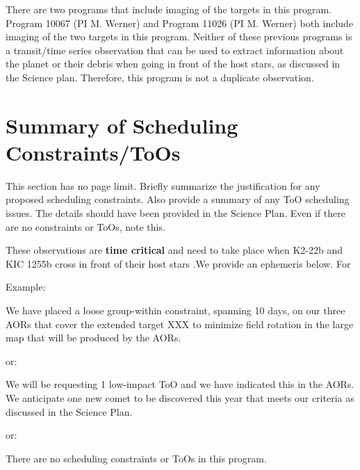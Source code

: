 \documentclass[letterpaper,12pt]{article}
\begin{document}
There are two programs that include imaging of the targets in this program.
Program 10067 (PI M. Werner) and Program 11026 (PI M. Werner) both include imaging of the two targets in this program.
Neither of these previous programs is a transit/time series observation that can be used to extract information about the planet or their debris when going in front of the host stars, as discussed in the Science plan.
Therefore, this program is not a duplicate observation.

%
%
%


\section{Summary of Scheduling Constraints/ToOs}

This section has no page limit. Briefly summarize the justification for 
any proposed scheduling constraints. 
Also provide a summary of any ToO scheduling issues. 
The details should have been provided in the Science Plan. Even if there 
are no constraints or ToOs, note this.\newline

These observations are \textbf{time critical} and need to take place when K2-22b and KIC 1255b cross in front of their host stars .We provide an ephemeris below. For

\noindent Example:

We have placed a loose group-within constraint, spanning 10 days,
on our three AORs that cover the extended target XXX to 
minimize field rotation in the large map that will be produced by the AORs.\newline

\noindent or:\noindent 

We will be requesting 1 low-impact ToO and we have indicated this in the 
AORs.  We anticipate one new comet to be discovered this year that meets 
our criteria as discussed in the Science Plan.\newline

\noindent or:

There are no scheduling constraints or ToOs in this program.
\end{document}
